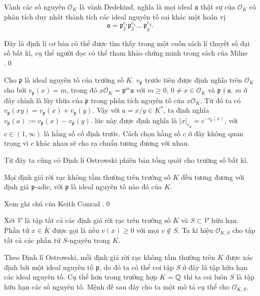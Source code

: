 \begin{theorem}\label{thm:integers-dedekind}
    Vành các số nguyên $\mathcal{O}_K$ là vành Dedekind, nghĩa là mọi ideal $\mathfrak{a}$ thật sự của $\mathcal{O}_K$ có phân tích duy nhất thành tích các ideal nguyên tố sai khác một hoán vị
    \begin{equation}
        \mathfrak{a} = \mathfrak{p}_2^{e_1} \mathfrak{p}_2^{e_2}...\ \mathfrak{p}_g^{e_g}.\label{eq:prime-ideals-fact}
    \end{equation}
\end{theorem}

\startproof Đây là định lí cơ bản có thể được tìm thấy trong một cuốn sách lí thuyết số đại số bất kì, cụ thể người đọc có thể tham khảo chứng minh trong sách của Milne \cite[Định lí 3.29]{MilneANT}.\qed

\begin{define}
    Cho $\mathfrak{p}$ là ideal nguyên tố của trường số $K$.  $v_{\mathfrak{p}}$ trước tiên được định nghĩa trên $\mathcal{O}_K$ cho bởi $v_\mathfrak{p}(x) = m$, trong đó $x \mathcal{O}_K = \mathfrak{p}^m \mathfrak{a}$ với $m \geq 0$, $0 \neq x \in \mathcal{O}_K$ và $\mathfrak{p} \nmid \mathfrak{a}$. $m$ ở đây chính là lũy thừa của $\mathfrak{p}$ trong phân tích nguyên tố của $x\mathcal{O}_K$. Từ đó ta có $v_{\mathfrak{p}}(xy) = v_{\mathfrak{p}}(x) + v_{\mathfrak{p}}(y)$. Vậy với $a = x/y \in K^*$, ta định nghĩa $v_{\mathfrak{p}}(a) := v_{\mathfrak{p}}(x) - v_{\mathfrak{p}}(y)$.  lúc này được định nghĩa là $|x|_{v_{\mathfrak{p}}} = c^{-v_\mathfrak{p}(x)}$, với $c \in (1,\infty)$ là hằng số cố định trước. Cách chọn hằng số $c$ ở đây không quan trọng vì $c$ khác nhau sẽ cho ra chuẩn tương đương với nhau.
\end{define}

Từ đây ta cũng có Định lí Ostrowski phiên bản tổng quát cho trường số bất kì.

\begin{theorem}[Ostrowski]\label{thm:ostrowski}
    Mọi định giá rời rạc không tầm thường trên trường số $K$ đều tương đương với định giá $\mathfrak{p}$-adic, với $\mathfrak{p}$ là ideal nguyên tố nào đó của $K$.
\end{theorem}

\startproof Xem ghi chú của Keith Conrad \cite{ConradOstrowski}.\qed

\begin{define}
    Xét $\mathcal{V}$ là tập tất cả các định giá rời rạc trên trường số $K$ và $S \subset \mathcal{V}$ hữu hạn. Phần tử $x \in K$ được gọi là  nếu $v(x) \geq 0$ với mọi $v \not\in S$. Ta kí hiệu $\mathcal{O}_{K,S}$ cho tập tất cả các phần tử $S$-nguyên trong $K$.

    Theo Định lí Ostrowski, mỗi định giá rời rạc không tầm thường trên $K$ được xác định bởi một ideal nguyên tố $\mathfrak{p}$, do đó ta có thể coi tập $S$ ở đây là tập hữu hạn các ideal nguyên tố. Cụ thể hơn trong trường hợp $K=\mathbb Q$ thì ta coi luôn $S$ là tập hữu hạn các số nguyên tố. Mệnh đề sau đây cho ta một mô tả cụ thể cho $\mathcal{O}_{K,S}$.
\end{define}

